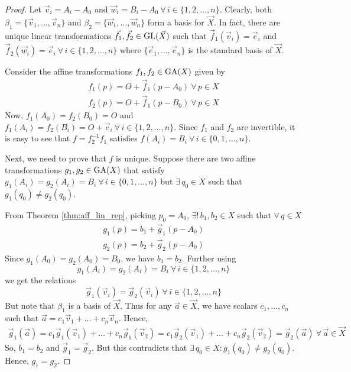 \begin{proof}
    Let $\vec{v}_i=A_i-A_0$ and $\vec{w}_i=B_i-A_0\ \forall\,i\in\{1,2,\dots,n\}$.
    Clearly, both $\beta_1=\{\vec{v}_1,\dots,\vec{v}_n\}$ and
    $\beta_2=\{\vec{w}_1,\dots,\vec{w}_n\}$ form a basis for $\vec{X}$. In fact,
    there are unique linear transformations $\vec{f}_1,\vec{f}_2\in\operatorname{GL}(\vec{X})$
    such that $\vec{f}_1(\vec{v}_i)=\vec{e}_i$ and
    $\vec{f}_2(\vec{w}_i)=\vec{e}_i\ \forall\,i\in\{1,2,\dots,n\}$ where
    $\{\vec{e}_1,\dots,\vec{e}_n\}$ is the standard basis of $\vec{X}$.
    \vspace{1ex}

    \noindent
    Consider the affine transformations $f_1,f_2\in\operatorname{GA}(X)$ given by
    \begin{align*}
        f_1(p) = O + \vec{f}_1(p-A_0)\ \forall\,p \in X \\
        f_2(p) = O + \vec{f}_1(p-B_0)\ \forall\,p \in X 
    \end{align*}
    Now, $f_1(A_0)=f_2(B_0)=O$ and
    $f_1(A_i)=f_2(B_i)=O+\vec{e}_i\ \forall\,i\in\{1,2,\dots,n\}$. Since $f_1$ and
    $f_2$ are invertible, it is easy to see that $f=f_2^{-1}f_1$ satisfies
    $f(A_i)=B_i\ \forall\,i\in\{0,1,\dots,n\}$.
    \vspace{1ex}

    \noindent
    Next, we need to prove that $f$ is unique. Suppose there are two affine
    transformations $g_1,g_2\in\operatorname{GA}(X)$ that satisfy
    $g_1(A_i)=g_2(A_i)=B_i\ \forall\,i\in\{0,1,\dots,n\}$ but $\exists\,q_0 \in X$
    such that $g_1(q_0) \neq g_2(q_0)$.
    \vspace{1ex}

    \noindent
    From Theorem \ref{thm:aff_lin_rep}, picking $p_0=A_0$,
    $\exists!\,b_1,b_2 \in X$ such that $\forall\,q \in X$
    \begin{align*}
        g_1(p) = b_1 + \vec{g}_1(p-A_0) \\
        g_2(p) = b_2 + \vec{g}_2(p-A_0)
    \end{align*}
    Since $g_1(A_0)=g_2(A_0)=B_0$, we have $b_1=b_2$. Further using
    \[ g_1(A_i)=g_2(A_i)=B_i\ \forall\,i\in\{1,2,\dots,n\} \]
    we get the relations
    \[ \vec{g}_1(\vec{v}_i)=\vec{g}_2(\vec{v}_i)\ \forall\,i\in\{1,2,\dots,n\} \]
    But note that $\beta_1$ is a basis of $\vec{X}$. Thus for any
    $\vec{a}\in\vec{X}$, we have scalars $c_1,\dots,c_n$ such that
    $\vec{a}=c_1\vec{v}_1+\dots+c_n\vec{v}_n$. Hence,
    \begin{align*}
        \vec{g}_1(\vec{a}) = c_1\vec{g}_1(\vec{v}_1)+\dots+c_n\vec{g}_1(\vec{v}_2)
        = c_1\vec{g}_2(\vec{v}_1)+\dots+c_n\vec{g}_2(\vec{v}_2)
        = \vec{g}_2(\vec{a})\ \forall\,\vec{a}\in\vec{X}
    \end{align*}
    So, $b_1=b_2$ and $\vec{g}_1=\vec{g}_2$. But this contradicts that
    $\exists\,q_0 \in X\colon g_1(q_0) \neq g_2(q_0)$. Hence, $g_1=g_2$.
\end{proof}

